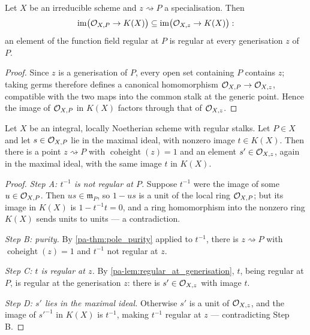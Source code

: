 \begin{lemma}
  \label{pa-lem:regular_at_generisation}
  \leanok

  Let \(X\) be an irreducible scheme and \(z \rightsquigarrow P\) a
  specialisation. Then
  \[
    \operatorname{im}\bigl(\mathcal{O}_{X,P} \to K(X)\bigr)
    \subseteq
    \operatorname{im}\bigl(\mathcal{O}_{X,z} \to K(X)\bigr):
  \]
  an element of the function field regular at \(P\) is regular at every
  generisation \(z\) of \(P\).
\end{lemma}
\begin{proof}
  \leanok
  Since \(z\) is a generisation of \(P\), every open set containing \(P\)
  contains \(z\); taking germs therefore defines a canonical homomorphism
  \(\mathcal{O}_{X,P} \to \mathcal{O}_{X,z}\), compatible with the two maps into the
  common stalk at the generic point. Hence the image of \(\mathcal{O}_{X,P}\) in
  \(K(X)\) factors through that of \(\mathcal{O}_{X,z}\).
\end{proof}

\begin{theorem}
  \label{pa-thm:zero_locus_pure_codim_one}
  \leanok

  Let \(X\) be an integral, locally Noetherian scheme with regular stalks. Let
  \(P \in X\) and let \(s \in \mathcal{O}_{X,P}\) lie in the maximal ideal, with
  nonzero image \(t \in K(X)\). Then there is a point \(z \rightsquigarrow P\)
  with \(\operatorname{coheight}(z) = 1\) and an element
  \(s' \in \mathcal{O}_{X,z}\), again in the maximal ideal, with the same image
  \(t\) in \(K(X)\).
\end{theorem}
\begin{proof}
  \leanok
  \emph{Step A: \(t^{-1}\) is not regular at \(P\).} Suppose
  \(t^{-1}\) were the image of some \(u \in \mathcal{O}_{X,P}\). Then \(u s \in
  \mathfrak m_P\), so \(1 - u s\) is a unit of the local ring
  \(\mathcal{O}_{X,P}\); but its image in \(K(X)\) is
  \(1 - t^{-1} t = 0\), and a ring homomorphism into the nonzero ring \(K(X)\)
  sends units to units --- a contradiction.

  \emph{Step B: purity.} By \ref{pa-thm:pole_purity} applied to \(t^{-1}\), there
  is \(z \rightsquigarrow P\) with \(\operatorname{coheight}(z) = 1\) and
  \(t^{-1}\) not regular at \(z\).

  \emph{Step C: \(t\) is regular at \(z\).} By
  \ref{pa-lem:regular_at_generisation}, \(t\), being regular at \(P\), is regular
  at the generisation \(z\): there is \(s' \in \mathcal{O}_{X,z}\) with image
  \(t\).

  \emph{Step D: \(s'\) lies in the maximal ideal.} Otherwise \(s'\) is a unit
  of \(\mathcal{O}_{X,z}\), and the image of \(s'^{-1}\) in \(K(X)\) is
  \(t^{-1}\), making \(t^{-1}\) regular at \(z\) --- contradicting Step B.
\end{proof}

